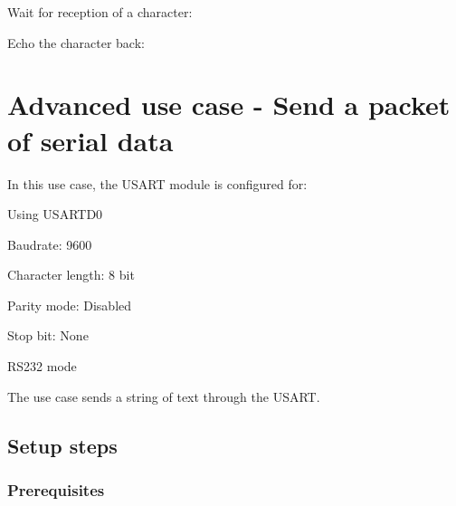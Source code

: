 \begin{DoxyEnumerate}
\item Wait for reception of a character\+:
\begin{DoxyItemize}
\item 
\begin{DoxyCode}{0}
\end{DoxyCode}

\end{DoxyItemize}
\item Echo the character back\+:
\begin{DoxyItemize}
\item 
\begin{DoxyCode}{0}
\end{DoxyCode}
 
\end{DoxyItemize}
\end{DoxyEnumerate}\hypertarget{serial_use_case_1}{}\section{Advanced use case -\/ Send a packet of serial data}\label{serial_use_case_1}
In this use case, the U\+S\+A\+RT module is configured for\+:
\begin{DoxyItemize}
\item Using U\+S\+A\+R\+T\+D0
\item Baudrate\+: 9600
\item Character length\+: 8 bit
\item Parity mode\+: Disabled
\item Stop bit\+: None
\item R\+S232 mode
\end{DoxyItemize}

The use case sends a string of text through the U\+S\+A\+RT.\hypertarget{serial_use_case_1_serial_use_case_1_setup}{}\subsection{Setup steps}\label{serial_use_case_1_serial_use_case_1_setup}
\hypertarget{serial_use_case_1_serial_use_case_1_setup_prereq}{}\subsubsection{Prerequisites}\label{serial_use_case_1_serial_use_case_1_setup_prereq}

